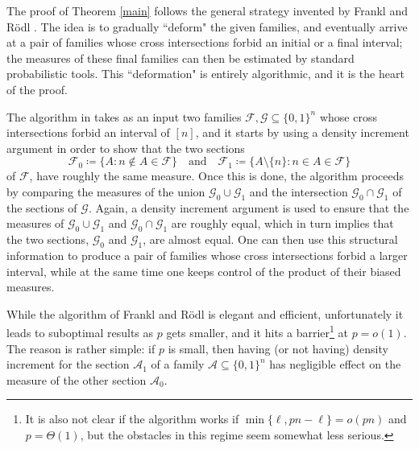 \documentclass[10pt,a4paper]{amsart}
\theoremstyle{remark}
\newcommand{\Fcal}{\mathcal{F}}
\newcommand{\Gcal}{\mathcal{G}}
\begin{document}
The proof of Theorem \ref{main} follows the general strategy invented by Frankl and R\"{o}dl \cite{FR87}.
The idea is to gradually ``deform" the given families, and eventually arrive at a pair of families whose
cross intersections forbid an initial or a final interval; the measures of these final families can then
be estimated by standard probabilistic tools. This ``deformation" is entirely algorithmic,
and it is the heart of the proof.

The algorithm in \cite{FR87} takes as an input two families $\Fcal,\Gcal\subseteq \{0,1\}^n$
whose cross intersections forbid an interval of $[n]$, and it starts by using a density increment
argument in order to show that the two sections
\[ \Fcal_0\coloneqq \{A: n\notin A\in\Fcal\} \ \ \ \text{ and } \ \ \
\Fcal_1\coloneqq \big\{A\setminus\{n\}: n\in A\in\mathcal{F}\big\} \]
of $\Fcal$, have roughly the same measure. Once this is done, the algorithm proceeds by comparing the measures
of the union $\Gcal_0\cup \Gcal_1$ and the intersection $\Gcal_0\cap \Gcal_1$ of the sections of $\Gcal$.
Again, a density increment argument is used to ensure that the measures of $\Gcal_0\cup \Gcal_1$ and
$\Gcal_0\cap \Gcal_1$ are roughly equal, which in turn implies that the two sections, $\Gcal_0$ and
$\Gcal_1$, are almost equal. One can then use this structural information to produce a pair
of families whose cross intersections forbid a larger interval, while at the same time one keeps
control of the product of their biased measures.

While the algorithm of Frankl and R\"{o}dl is elegant and efficient, unfortunately it leads
to suboptimal results as $p$ gets smaller, and it hits a barrier\footnote{It is also not clear
if the algorithm works if $\min\{\ell,pn-\ell\}=o(pn)$ and $p=\Theta(1)$, but the obstacles in this regime
seem somewhat less serious.} at $p=o(1)$. The reason is rather simple: if $p$ is small,
then having (or not having) density increment for the section $\mathcal{A}_1$ of a family
$\mathcal{A}\subseteq \{0,1\}^n$ has negligible effect on the measure of the other section $\mathcal{A}_0$.
\end{document}
